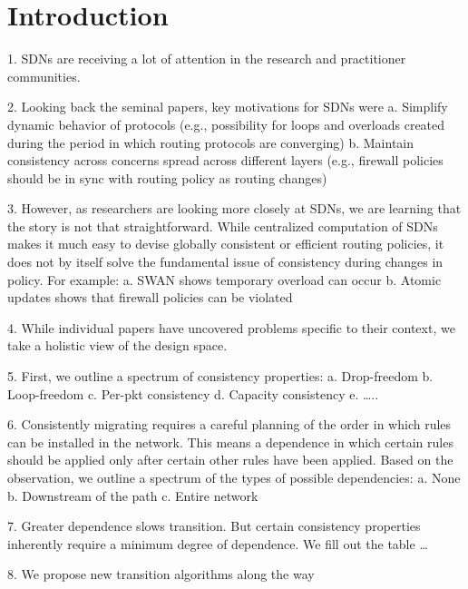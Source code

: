 \section{Introduction}
\label{sec:intro}

1.	SDNs are receiving a lot of attention in the research and practitioner communities.

2.	Looking back the seminal papers, key motivations for SDNs were
a.	Simplify dynamic behavior of protocols (e.g., possibility for loops and overloads created during the period in which routing protocols are converging)
b.	Maintain consistency across concerns spread across different layers (e.g., firewall policies should be in sync with routing policy as routing changes)

3.	However, as researchers are looking more closely at SDNs, we are learning that the story is not that straightforward.  While centralized computation of SDNs makes it much easy to devise globally consistent or efficient routing policies, it does not by itself solve the fundamental issue of consistency during changes in policy.  For example:
a.	SWAN shows temporary overload can occur
b.	Atomic updates shows that firewall policies can be violated

4.	While individual papers have uncovered problems specific to their context, we take a holistic view of the design space.

5.	First, we outline a spectrum of consistency properties:
a.	Drop-freedom
b.	Loop-freedom
c.	Per-pkt consistency
d.	Capacity consistency
e.	…..

6.	Consistently migrating requires a careful planning of the order in which rules can be installed in the network. This means a dependence in which certain rules should be applied only after certain other rules have been applied.  Based on the observation, we outline a spectrum of the types of possible dependencies:
a.	None
b.	Downstream of the path
c.	Entire network

7.	Greater dependence slows transition. But certain consistency properties inherently require a minimum degree of dependence. We fill out the table …

8.	We propose new transition algorithms along the way

